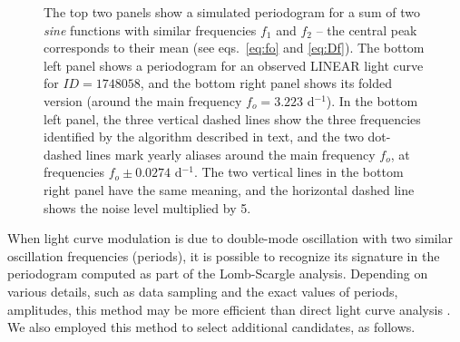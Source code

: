 \begin{figure}[ht]
  \centering
  \caption{The top two panels show a simulated periodogram for a sum of two {\it sine} functions with similar frequencies
    $f_1$ and  $f_2$ --   the central peak corresponds to their mean (see eqs.~\ref{eq:fo} and \ref{eq:Df}).
    The bottom left panel shows a periodogram for an observed LINEAR light curve for $ID=1748058$, and the bottom right panel shows its
    folded version (around the main frequency $f_o=3.223$ d$^{-1}$). In the bottom left panel, the three vertical dashed
    lines show the three  frequencies identified by the algorithm described in text, and the two dot-dashed lines mark
    yearly aliases around the main frequency $f_o$, at frequencies $f_o \pm 0.0274$ d$^{-1}$. The two vertical lines in the
    bottom right panel have the same meaning, and the horizontal dashed line shows the noise level multiplied by 5.}
\label{fig:periodogram}
\end{figure}

  
When light curve modulation is due to double-mode oscillation with two similar oscillation frequencies (periods),
it is possible to recognize its signature in the periodogram computed as part of the Lomb-Scargle analysis. Depending
on various details, such as data sampling and the exact values of periods, amplitudes, this method may be
more efficient than direct light curve analysis \citep{2020MNRAS.494.1237S}. We also employed this method to select
additional candidates, as follows.

